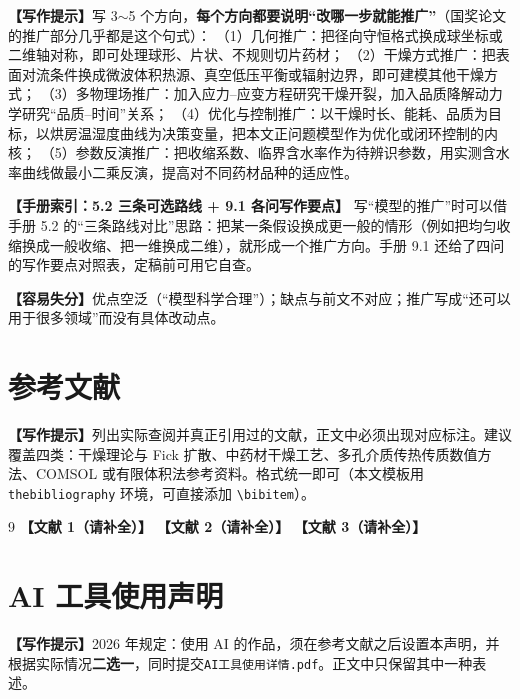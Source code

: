 \documentclass[12pt,a4paper]{article}
\newcommand{\prompt}[1]{\par\noindent\textbf{【写作提示】}#1\par}      %
\newcommand{\pitfall}[1]{\par\noindent\textbf{【容易失分】}#1\par}     %
\newcommand{\ph}[1]{\textbf{【#1】}}                                   %
\newcommand{\handbook}[2]{\par\noindent\textbf{【手册索引：#1】} #2\par}
\begin{document}
\prompt{写 3$\sim$5 个方向，\textbf{每个方向都要说明“改哪一步就能推广”}（国奖论文的推广部分几乎都是这个句式）：
（1）几何推广：把径向守恒格式换成球坐标或二维轴对称，即可处理球形、片状、不规则切片药材；
（2）干燥方式推广：把表面对流条件换成微波体积热源、真空低压平衡或辐射边界，即可建模其他干燥方式；
（3）多物理场推广：加入应力–应变方程研究干燥开裂，加入品质降解动力学研究“品质–时间”关系；
（4）优化与控制推广：以干燥时长、能耗、品质为目标，以烘房温湿度曲线为决策变量，把本文正问题模型作为优化或闭环控制的内核；
（5）参数反演推广：把收缩系数、临界含水率作为待辨识参数，用实测含水率曲线做最小二乘反演，提高对不同药材品种的适应性。}

\handbook{5.2 三条可选路线 + 9.1 各问写作要点}{写“模型的推广”时可以借手册 5.2 的“三条路线对比”思路：把某一条假设换成更一般的情形（例如把均匀收缩换成一般收缩、把一维换成二维），就形成一个推广方向。手册 9.1 还给了四问的写作要点对照表，定稿前可用它自查。}

\pitfall{优点空泛（“模型科学合理”）；缺点与前文不对应；推广写成“还可以用于很多领域”而没有具体改动点。}

\clearpage

\section{参考文献}

\prompt{列出实际查阅并真正引用过的文献，正文中必须出现对应标注。建议覆盖四类：干燥理论与 Fick 扩散、中药材干燥工艺、多孔介质传热传质数值方法、COMSOL 或有限体积法参考资料。格式统一即可（本文模板用 \texttt{thebibliography} 环境，可直接添加 \texttt{\textbackslash bibitem}）。}

\begin{thebibliography}{9}
 \ph{文献 1（请补全）}
 \ph{文献 2（请补全）}
 \ph{文献 3（请补全）}
\end{thebibliography}

\clearpage

\section*{AI 工具使用声明}

\prompt{2026 年规定：使用 AI 的作品，须在参考文献之后设置本声明，并根据实际情况\textbf{二选一}，同时提交\texttt{AI工具使用详情.pdf}。正文中只保留其中一种表述。}
\end{document}

